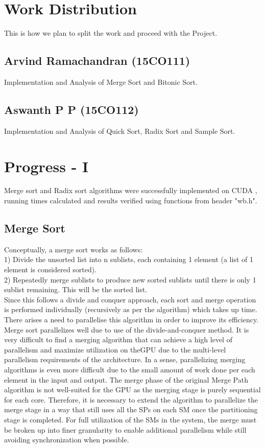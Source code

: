 \documentclass[journal]{IEEEtran}
\begin{document}
\section{Work Distribution}
This is how we plan to split the work and proceed with the Project.
\subsection{Arvind Ramachandran (15CO111)}
Implementation and Analysis of Merge Sort and Bitonic Sort.
\subsection{Aswanth P P (15CO112)}
Implementation and Analysis of Quick Sort, Radix Sort and Sample Sort.

\section{Progress - I}
Merge sort and Radix sort algorithms were successfully implemented on CUDA , running times calculated and results verified using functions from header "wb.h".

\subsection{Merge Sort}
Conceptually, a merge sort works as follows:
   \\1) Divide the unsorted list into n sublists, each containing 1 element (a list of 1 element is considered sorted).\\
   2) Repeatedly merge sublists to produce new sorted sublists until there is only 1 sublist remaining. This will be the sorted list.\\
   
   Since this follows a divide and conquer approach, each sort and merge operation is performed individually (recursively as per the algorithm)
 which takes up time. There arises a need to parallelise this algorithm in order to improve its efficiency. Merge sort parallelizes well due to use of the divide-and-conquer method. It is very difficult to find a merging algorithm that can achieve
a high level of parallelism and maximize utilization on theGPU due to the multi-level parallelism requirements of the
architecture. In a sense, parallelizing merging algorithms is
even more difficult due to the small amount of work done
per each element in the input and output. The merge phase
of the original Merge Path algorithm is not well-suited for
the GPU as the merging stage is purely sequential for each
core. Therefore, it is necessary to extend the algorithm to
parallelize the merge stage in a way that still uses all the
SPs on each SM once the partitioning stage is completed. For full utilization of the SMs in the system, the merge
must be broken up into finer granularity to enable additional
parallelism while still avoiding synchronization when possible. \\
\end{document}
